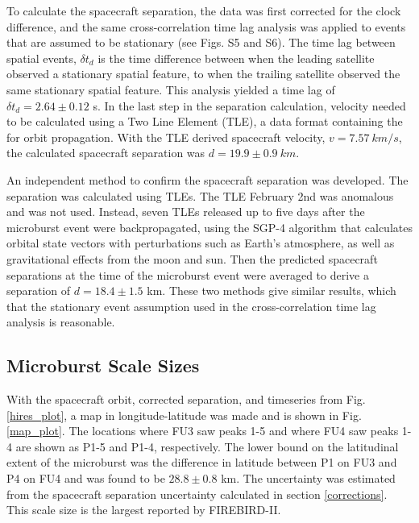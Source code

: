 \documentclass[draft, linenumbers]{agujournal}
\begin{document}
To calculate the spacecraft separation, the data was first corrected for the clock difference, and the same cross-correlation time lag analysis was applied to events that are assumed to be stationary (see Figs. S5 and S6). The time lag between spatial events, $\delta t_{d}$ is the time difference between when the leading satellite observed a stationary spatial feature, to when the trailing satellite observed the same stationary spatial feature. This analysis yielded a time lag of $\delta t_{d} = 2.64 \pm 0.12$ s. In the last step in the separation calculation,  velocity needed to be calculated using a Two Line Element (TLE), a data format containing the  for orbit propagation. With the TLE derived spacecraft velocity, $v = 7.57 \ km/s$, the calculated spacecraft separation was $d = 19.9 \pm 0.9 \ km $.

An independent method to confirm the spacecraft separation was developed. The separation was calculated using TLEs. The TLE  February 2nd was anomalous and was not used. Instead, seven TLEs released up to five days after the microburst event were backpropagated, using the SGP-4 algorithm \citep{sgp4} that calculates orbital state vectors with perturbations such as Earth's atmosphere, as well as gravitational effects from the moon and sun. Then the predicted spacecraft separations at the time of the microburst event were averaged to derive a separation of $d = 18.4 \pm 1.5$ km. These two methods give similar results, which  that the stationary event assumption used in the cross-correlation time lag analysis is reasonable.

\subsection{Microburst Scale Sizes} \label{scale_size} %
With the spacecraft orbit, corrected separation, and timeseries from Fig. \ref{hires_plot}, a map  in longitude-latitude was made and is shown in Fig. \ref{map_plot}. The locations where FU3 saw peaks 1-5 and where FU4 saw peaks 1-4 are shown as P1-5 and P1-4, respectively. The lower bound on the latitudinal extent of the microburst was the difference in latitude between P1 on FU3 and P4 on FU4 and was found to be $28.8 \pm 0.8$ km. The uncertainty was estimated from the spacecraft separation uncertainty calculated in section \ref{corrections}. This scale size is the largest reported by FIREBIRD-II.
\end{document}
